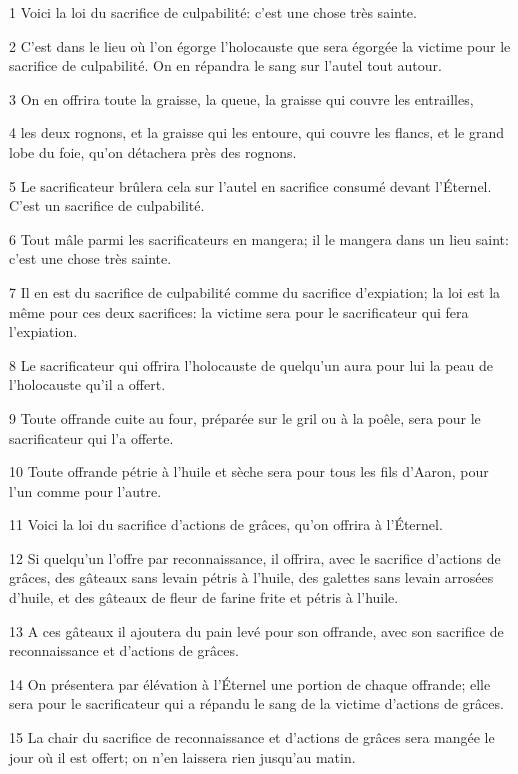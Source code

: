 \par 1 Voici la loi du sacrifice de culpabilité: c'est une chose très sainte.
\par 2 C'est dans le lieu où l'on égorge l'holocauste que sera égorgée la victime pour le sacrifice de culpabilité. On en répandra le sang sur l'autel tout autour.
\par 3 On en offrira toute la graisse, la queue, la graisse qui couvre les entrailles,
\par 4 les deux rognons, et la graisse qui les entoure, qui couvre les flancs, et le grand lobe du foie, qu'on détachera près des rognons.
\par 5 Le sacrificateur brûlera cela sur l'autel en sacrifice consumé devant l'Éternel. C'est un sacrifice de culpabilité.
\par 6 Tout mâle parmi les sacrificateurs en mangera; il le mangera dans un lieu saint: c'est une chose très sainte.
\par 7 Il en est du sacrifice de culpabilité comme du sacrifice d'expiation; la loi est la même pour ces deux sacrifices: la victime sera pour le sacrificateur qui fera l'expiation.
\par 8 Le sacrificateur qui offrira l'holocauste de quelqu'un aura pour lui la peau de l'holocauste qu'il a offert.
\par 9 Toute offrande cuite au four, préparée sur le gril ou à la poêle, sera pour le sacrificateur qui l'a offerte.
\par 10 Toute offrande pétrie à l'huile et sèche sera pour tous les fils d'Aaron, pour l'un comme pour l'autre.
\par 11 Voici la loi du sacrifice d'actions de grâces, qu'on offrira à l'Éternel.
\par 12 Si quelqu'un l'offre par reconnaissance, il offrira, avec le sacrifice d'actions de grâces, des gâteaux sans levain pétris à l'huile, des galettes sans levain arrosées d'huile, et des gâteaux de fleur de farine frite et pétris à l'huile.
\par 13 A ces gâteaux il ajoutera du pain levé pour son offrande, avec son sacrifice de reconnaissance et d'actions de grâces.
\par 14 On présentera par élévation à l'Éternel une portion de chaque offrande; elle sera pour le sacrificateur qui a répandu le sang de la victime d'actions de grâces.
\par 15 La chair du sacrifice de reconnaissance et d'actions de grâces sera mangée le jour où il est offert; on n'en laissera rien jusqu'au matin.
